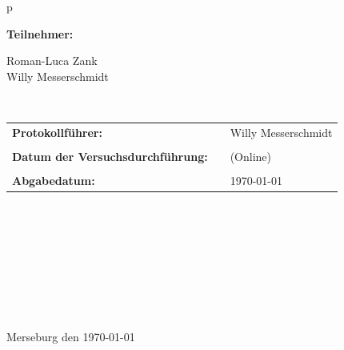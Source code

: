 \begin{center}
\begin{tabular}{p{\textwidth}}

\begin{center}
\Large{\textbf{Teilnehmer:}} \\ 
\end{center}
\begin{center}
\large{Roman-Luca Zank \\
	Willy Messerschmidt} \\
\end{center}


\\

\begin{center}
\begin{tabular}{lll}
\large{\textbf{Protokollführer:}} & & \large{Willy Messerschmidt}\\
&&\\
\large{\textbf{Datum der Versuchsdurchführung:}}&& \large{ (Online)}\\
&&\\
\large{\textbf{Abgabedatum:}}&& \large{\today}
\end{tabular}
\end{center}

\\ \\ \\ \\ \\ \\ \\ \\ 
\large{Merseburg den \today}

\end{tabular}
\end{center}
